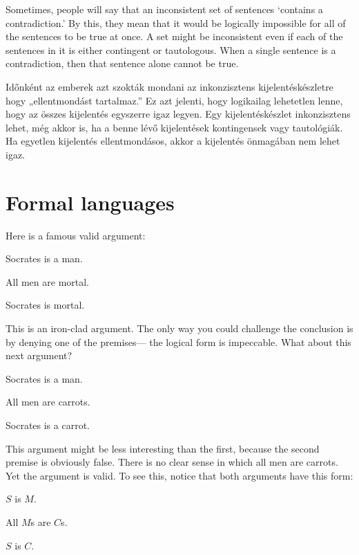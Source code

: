 Sometimes, people will say that an inconsistent set of sentences ‘contains a contradiction.’ By this, they mean that it would be logically impossible for all of the sentences to be true at once. A set might be inconsistent even if each of the sentences in it is either contingent or tautologous. When a single sentence is a contradiction, then that sentence alone cannot be true.

Időnként az emberek azt szokták mondani az inkonzisztens kijelentéskészletre hogy „ellentmondást tartalmaz.” Ez azt jelenti, hogy logikailag lehetetlen lenne, hogy az összes kijelentés egyszerre igaz legyen. Egy kijelentéskészlet inkonzisztens lehet, még akkor is, ha a benne lévő kijelentések kontingensek vagy tautológiák. Ha egyetlen kijelentés ellentmondásos, akkor a kijelentés önmagában nem lehet igaz.




\section{Formal languages}

Here is a famous valid argument:
\begin{earg}
\item[] Socrates is a man.
\item[] All men are mortal.
\item[\therefore] Socrates is mortal.
\end{earg}
This is an iron-clad argument. The only way you could challenge the conclusion is by denying one of the premises--- the logical form is impeccable. What about this next argument?

\begin{earg}
\item[] Socrates is a man.
\item[] All men are carrots.
\item[\therefore] Socrates is a carrot.
\end{earg}

This argument might be less interesting than the first, because the second premise is obviously false. There is no clear sense in which all men are carrots. Yet the argument is valid. To see this, notice that both arguments have this form:

\begin{earg}
\item[] $S$ is $M$.
\item[] All $M$s are $C$s.
\item[\therefore] $S$ is $C$.
\end{earg}

